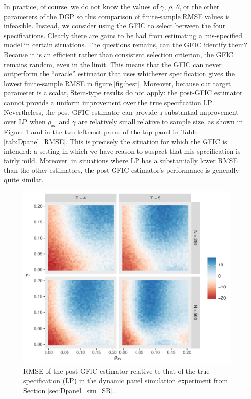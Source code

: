 In practice, of course, we do not know the values of $\gamma$, $\rho$, $\theta$, or the other parameters of the DGP so this comparison of finite-sample RMSE values is infeasible.
Instead, we consider using the GFIC to select between the four specifications.
Clearly there are gains to be had from estimating a mis-specified model in certain situations.
The questions remains, can the GFIC identify them?
Because it is an efficient rather than consistent selection criterion, the GFIC remains random, even in the limit.
This means that the GFIC can never outperform the ``oracle'' estimator that uses whichever specification gives the lowest finite-sample RMSE in figure \ref{fig:best}.
Moreover, because our target parameter is a scalar, Stein-type results do not apply: the post-GFIC estimator cannot provide a uniform improvement over the true specification $\text{LP}$.
Nevertheless, the post-GFIC estimator can provide a substantial improvement over $\text{LP}$ when $\rho_{xv}$ and $\gamma$ are relatively small relative to sample size, as shown in Figure \ref{fig:GFIC_rel_LP} and in the two leftmost panes of the top panel in Table \ref{tab:Dpanel_RMSE}.
This is precisely the situation for which the GFIC is intended: a setting in which we have reason to suspect that mis-specification is fairly mild.
Moreover, in situations where $\text{LP}$ has a substantially lower RMSE than the other estimators, the post GFIC-estimator's performance is generally quite similar.

\begin{figure}
\centering
\includegraphics[scale = 0.8]{./simulations/DynamicPanel/results/Dpanel_GFIC_RMSE_rel_LP}
\caption{RMSE of the post-GFIC estimator relative to that of the true specification ($\text{LP}$) in the dynamic panel simulation experiment from Section \ref{sec:Dpanel_sim_SR}.}
\label{fig:GFIC_rel_LP}
\end{figure}


